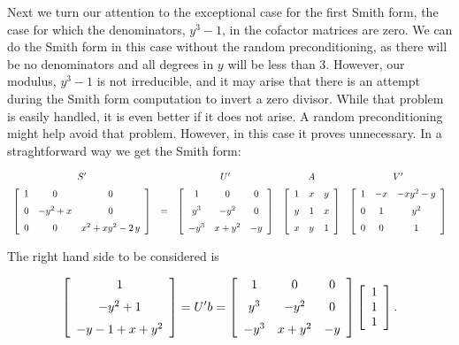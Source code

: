 Next we turn our attention to the exceptional case for the first Smith form, the case for which
the denominators, $y^3 - 1$, in the cofactor matrices are zero.  
We can do the Smith form in this case without the random preconditioning, as there
will be no denominators and all degrees in $y$ will be less than 3.  However,
our modulus, $y^3 - 1$ is not irreducible, and it may arise that there is an attempt
during the Smith form computation to invert a zero divisor.  While that problem
is easily handled, it is even better if it does not arise.  A random preconditioning
might help avoid that problem.  However, in this case it proves unnecessary.
In a straghtforward way we get the Smith form:

\[
\begin{array}{ccccc}
S' & ~ & U' & A & V'\\\noalign{\medskip}

\left [\begin {array}{ccc} 1&0&0\\\noalign{\medskip}0&-{y}^{2}+x&0\\\noalign{\medskip}
0&0&{x}^{2}+x{y}^{2}-2\,y\end {array}\right ]
& = &
\left [\begin {array}{ccc} 1&0&0\\\noalign{\medskip}{y}^{3}&-{y}^{2}&0\\\noalign{\medskip}
-{y}^{3}&x+{y}^{2}&-y\end {array}\right ]
&
\left [\begin {array}{ccc} 1&x&y\\\noalign{\medskip}y&1&x\\\noalign{\medskip}
x&y&1\end {array}\right ]
&
\left [\begin {array}{ccc} 1&-x&-x{y}^{2}-y\\\noalign{\medskip}0&1&{y}^
{2}\\\noalign{\medskip}0&0&1\end {array}\right ]
\end{array}
\]

The right hand side to be considered %
is
 
\[ 
\left [\begin {array}{c} 1\\\noalign{\medskip}-{y}^{2}+1\\\noalign{\medskip}
-y-1+x+{y}^{2}\end {array}\right ]
= U'b = 
\left [\begin {array}{ccc} 1&0&0\\\noalign{\medskip}{y}^{3}&-{y}^{2}&0\\\noalign{\medskip}
-{y}^{3}&x+{y}^{2}&-y\end {array}\right ]
\left [\begin {array}{c} 1\\1\\1 \end {array}\right ].
\]

